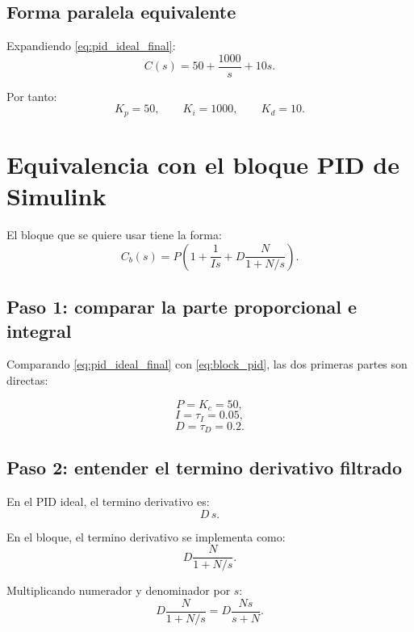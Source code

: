 \documentclass[11pt]{article}
\begin{document}
\subsection{Forma paralela equivalente}

Expandiendo \eqref{eq:pid_ideal_final}:
\begin{equation}
C(s)=50+\frac{1000}{s}+10s.
\end{equation}

Por tanto:
\[
K_p=50,\qquad K_i=1000,\qquad K_d=10.
\]

\section{Equivalencia con el bloque PID de Simulink}

El bloque que se quiere usar tiene la forma:
\begin{equation}
C_b(s)=P\left(1+\frac{1}{Is}+D\frac{N}{1+N/s}\right).
\label{eq:block_pid}
\end{equation}

\subsection{Paso 1: comparar la parte proporcional e integral}

Comparando \eqref{eq:pid_ideal_final} con \eqref{eq:block_pid}, las dos primeras partes son directas:

\begin{equation}
P=K_c=50,
\end{equation}
\begin{equation}
I=\tau_I=0.05,
\end{equation}
\begin{equation}
D=\tau_D=0.2.
\end{equation}

\subsection{Paso 2: entender el termino derivativo filtrado}

En el PID ideal, el termino derivativo es:
\[
D\,s.
\]

En el bloque, el termino derivativo se implementa como:
\[
D\frac{N}{1+N/s}.
\]

Multiplicando numerador y denominador por $s$:
\begin{equation}
D\frac{N}{1+N/s}
=
D\frac{Ns}{s+N}.
\label{eq:filtered_derivative}
\end{equation}
\end{document}
